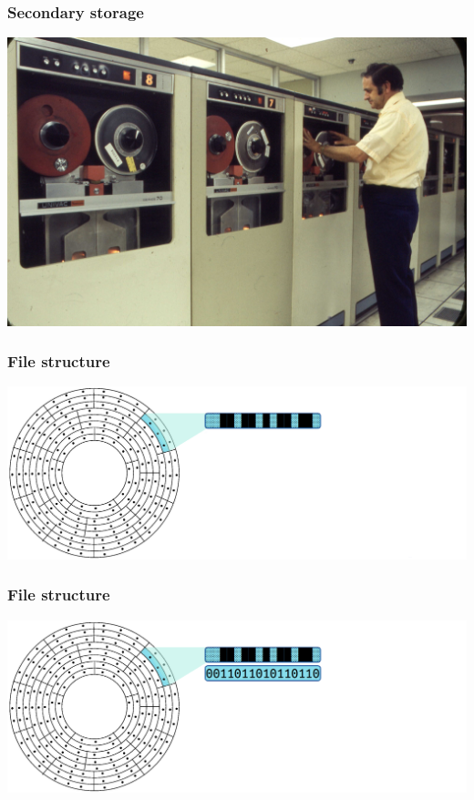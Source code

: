 \documentclass[11pt]{beamer}
\begin{document}
\begin{frame}[fragile]
  \frametitle{Secondary storage}

  \includegraphics[width=\textwidth]{./img/file-structure-drive.png}
\end{frame}


\begin{frame}[fragile]
  \frametitle{File structure}

  \includegraphics[width=\textwidth]{./img/file-structure-01.png}
\end{frame}

\begin{frame}[fragile]
  \frametitle{File structure}

  \includegraphics[width=\textwidth]{./img/file-structure-02.png}
\end{frame}
\end{document}
